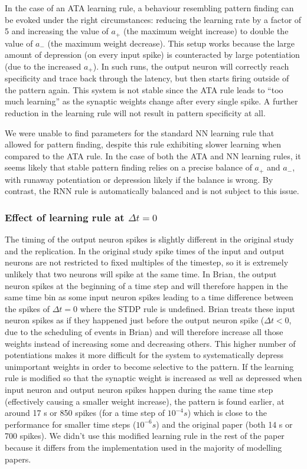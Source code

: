 \documentclass[10pt,a4paper,onecolumn]{article}
\begin{document}
In the case of an ATA learning rule, a behaviour resembling pattern
finding can be evoked under the right circumstances: reducing the
learning rate by a factor of 5 and increasing the value of \(a_{+}\)
(the maximum weight increase) to double the value of \(a_{-}\) (the
maximum weight decrease). This setup works because the large amount of
depression (on every input spike) is counteracted by large potentiation
(due to the increased \(a_{+}\)). In such runs, the output neuron will
correctly reach specificity and trace back through the latency, but then
starts firing outside of the pattern again. This system is not stable
since the ATA rule leads to ``too much learning'' as the synaptic
weights change after every single spike. A further reduction in the
learning rule will not result in pattern specificity at all.

We were unable to find parameters for the standard NN learning rule that
allowed for pattern finding, despite this rule exhibiting slower
learning when compared to the ATA rule. In the case of both the ATA and
NN learning rules, it seems likely that stable pattern finding relies on
a precise balance of \(a_{+}\) and \(a_{-}\), with runaway potentiation
or depression likely if the balance is wrong. By contrast, the RNN rule
is automatically balanced and is not subject to this issue.

\subsubsection{\texorpdfstring{Effect of learning rule at
\(\Delta t=0\)}{Effect of learning rule at \textbackslash{}Delta t=0}}\label{effect-of-learning-rule-at-delta-t0}

The timing of the output neuron spikes is slightly different in the
original study and the replication. In the original study spike times of
the input and output neurons are not restricted to fixed multiples of
the timestep, so it is extremely unlikely that two neurons will spike at
the same time. In Brian, the output neuron spikes at the beginning of a
time step and will therefore happen in the same time bin as some input
neuron spikes leading to a time difference between the spikes of
\(\Delta t=0\) where the STDP rule is undefined. Brian treats these
input neuron spikes as if they happened just before the output neuron
spike (\(\Delta t<0\), due to the scheduling of events in Brian) and
will therefore increase all those weights instead of increasing some and
decreasing others. This higher number of potentiations makes it more
difficult for the system to systematically depress unimportant weights
in order to become selective to the pattern. If the learning rule is
modified so that the synaptic weight is increased as well as depressed
when input neuron and output neuron spikes happen during the same time
step (effectively causing a smaller weight increase), the pattern is
found earlier, at around 17 s or 850 spikes (for a time step of
\(10^{-4}s\)) which is close to the performance for smaller time steps
(\(10^{-6}s\)) and the original paper (both 14 s or 700 spikes). We
didn't use this modified learning rule in the rest of the paper because
it differs from the implementation used in the majority of modelling
papers.
\end{document}
